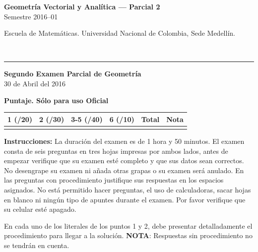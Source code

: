 \documentclass[11pt]{article}
\newcommand{\examheader}{%
  \noindent
  \begin{minipage}[t]{0.6\linewidth}
    {\small\bfseries Geometría Vectorial y Analítica --- Parcial 2}\\
    {\small Semestre 2016--01}
  \end{minipage}%
  \hfill
  \begin{minipage}[t]{0.35\linewidth}
    \raggedleft\small Escuela de Matemáticas. Universidad Nacional de Colombia, Sede Medellín.
  \end{minipage}\\[2pt]
  \rule{\linewidth}{0.6pt}
}
\begin{document}
\examheader

\begin{center}
{\bfseries Segundo Examen Parcial de Geometría}\\
30 de Abril del 2016

\vspace{4pt}
\textbf{Puntaje. Sólo para uso Oficial}

\vspace{2pt}
\begin{tabular}{|c|c|c|c|c|c|}
\hline
1 (/20) & 2 (/30) & 3-5 (/40) & 6 (/10) & Total & Nota\\
\hline
 & & & & & \\
\hline
\end{tabular}
\end{center}

\textbf{Instrucciones:} La duración del examen es de 1 hora y 50 minutos. El examen consta de seis preguntas en tres hojas impresas por ambos lados, antes de empezar verifique que su examen esté completo y que sus datos sean correctos. No desengrape su examen ni añada otras grapas o su examen será anulado. En las preguntas con procedimiento justifique sus respuestas en los espacios asignados. No está permitido hacer preguntas, el uso de calculadoras, sacar hojas en blanco ni ningún tipo de apuntes durante el examen. Por favor verifique que su celular esté apagado.

\vspace{10pt}

En cada uno de los literales de los puntos 1 y 2, debe presentar detalladamente el procedimiento para llegar a la solución. \textbf{NOTA}: Respuestas sin procedimiento no se tendrán en cuenta.
\end{document}
